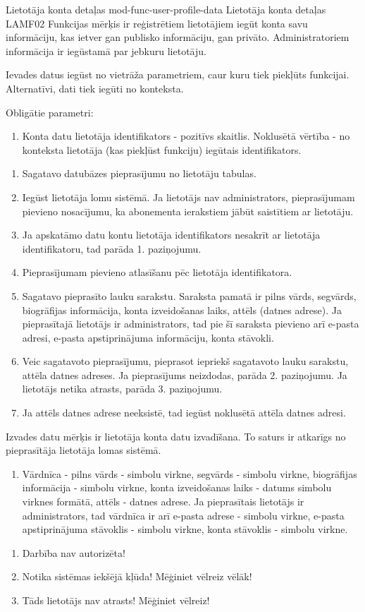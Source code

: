 \moduleFunctionTable
{Lietotāja konta detaļas}
{mod-func-user-profile-data}
{Lietotāja konta detaļas}
{LAMF02}
{
	Funkcijas mērķis ir reģistrētiem lietotājiem iegūt konta savu informāciju, kas ietver gan publisko informāciju, gan privāto.
	Administratoriem informācija ir iegūstamā par jebkuru lietotāju.
}
{
	Ievades datus iegūst no vietrāža parametriem, caur kuru tiek piekļūts funkcijai.
	Alternatīvi, dati tiek iegūti no konteksta.

	Obligātie parametri:
	\begin{enumerate}
		\item Konta datu lietotāja identifikators - pozitīvs skaitlis.
		      Noklusētā vērtība - no konteksta lietotāja (kas piekļūst funkciju) iegūtais identifikators.
	\end{enumerate}
}
{
	\begin{enumerate}
		\item Sagatavo datubāzes pieprasījumu no lietotāju tabulas.
		\item Iegūst lietotāja lomu sistēmā.
		      Ja lietotājs nav administrators, pieprasījumam pievieno nosacījumu, ka abonementa ierakstiem jābūt saistītiem ar lietotāju.
		\item Ja apskatāmo datu kontu lietotāja identifikators nesakrīt ar lietotāja identifikatoru, tad parāda 1. paziņojumu.
		\item Pieprasījumam pievieno atlasīšanu pēc lietotāja identifikatora.
		\item Sagatavo pieprasīto lauku sarakstu.
		      Saraksta pamatā ir pilns vārds, segvārds, biogrāfijas informācija, konta izveidošanas laiks, attēls (datnes adrese).
		      Ja pieprasītajā lietotājs ir administrators, tad pie šī saraksta pievieno arī e-pasta adresi, e-pasta apstiprinājuma informāciju, konta stāvokli.
		\item Veic sagatavoto pieprasījumu, pieprasot iepriekš sagatavoto lauku sarakstu, attēla datnes adreses.
		      Ja pieprasījums neizdodas, parāda 2. paziņojumu.
		      Ja lietotājs netika atrasts, parāda 3. paziņojumu.
		\item Ja attēls datnes adrese neeksistē, tad iegūst noklusētā attēla datnes adresi.
	\end{enumerate}
}
{
	Izvades datu mērķis ir lietotāja konta datu izvadīšana.
	To saturs ir atkarīgs no pieprasītāja lietotāja lomas sistēmā.

	\begin{enumerate}
		\item Vārdnīca - pilns vārds - simbolu virkne, segvārds - simbolu virkne, biogrāfijas informācija - simbolu virkne, konta izveidošanas laiks - datums simbolu virknes formātā, attēls - datnes adrese.
		      Ja pieprasītais lietotājs ir administrators, tad vārdnīca ir arī e-pasta adrese - simbolu virkne, e-pasta apstiprinājuma stāvoklis - simbolu virkne, konta stāvoklis - simbolu virkne.
	\end{enumerate}

}
{
	\begin{enumerate}
		\item Darbība nav autorizēta!
		\item Notika sistēmas iekšējā kļūda! Mēģiniet vēlreiz vēlāk!
		\item Tāds lietotājs nav atrasts! Mēģiniet vēlreiz!
	\end{enumerate}
}
